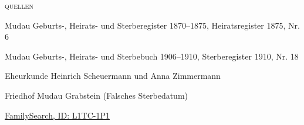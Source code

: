 \begin{person}[
    surname = {Scheuermann},
    givenname = {Johann Valentin},
    suffix = {1842--1910},
    label = {@I389@}
    ]
\medbreak
\textsc{{quellen}}
\begin{enumerate}[label={[\arabic*]}]
\item Mudau Geburts-, Heirats- und Sterberegister 1870–1875, Heiratsregister 1875, Nr. 6 
\item Mudau Geburts-, Heirats- und Sterbebuch 1906–1910, Sterberegister 1910, Nr. 18
\item Eheurkunde Heinrich Scheuermann und Anna Zimmermann
\item Friedhof Mudau Grabstein (Falsches Sterbedatum)
\item \href{https://www.familysearch.org/tree/person/details/L1TC-1P1}{FamilySearch, ID: L1TC-1P1}
\end{enumerate}

\end{person}

